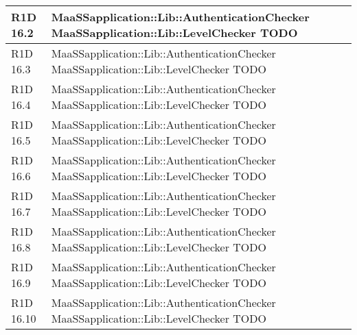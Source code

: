 \begin{center}
\begin{longtable}{ | l | p{8cm} |}
    R1D 16.2 & MaaSSapplication::Lib::AuthenticationChecker \newline MaaSSapplication::Lib::LevelChecker \newline  TODO \\ \hline

    R1D 16.3 & MaaSSapplication::Lib::AuthenticationChecker \newline MaaSSapplication::Lib::LevelChecker \newline  TODO \\ \hline

    R1D 16.4 & MaaSSapplication::Lib::AuthenticationChecker \newline MaaSSapplication::Lib::LevelChecker \newline  TODO \\ \hline

    R1D 16.5 & MaaSSapplication::Lib::AuthenticationChecker \newline MaaSSapplication::Lib::LevelChecker \newline  TODO \\ \hline
    
    R1D 16.6 & MaaSSapplication::Lib::AuthenticationChecker \newline MaaSSapplication::Lib::LevelChecker \newline  TODO \\ \hline
    
    R1D 16.7 & MaaSSapplication::Lib::AuthenticationChecker \newline MaaSSapplication::Lib::LevelChecker \newline  TODO \\ \hline
    
    R1D 16.8 & MaaSSapplication::Lib::AuthenticationChecker \newline MaaSSapplication::Lib::LevelChecker \newline  TODO \\ \hline

    R1D 16.9 & MaaSSapplication::Lib::AuthenticationChecker \newline MaaSSapplication::Lib::LevelChecker \newline  TODO \\ \hline
    
    R1D 16.10 & MaaSSapplication::Lib::AuthenticationChecker \newline MaaSSapplication::Lib::LevelChecker \newline  TODO \\ \hline
    

\end{longtable}
\end{center}
